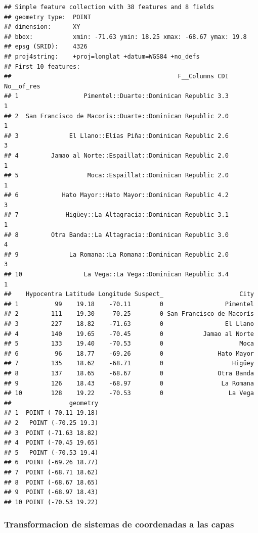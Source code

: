 \documentclass[11pt,]{article}
\begin{document}
\begin{verbatim}
## Simple feature collection with 38 features and 8 fields
## geometry type:  POINT
## dimension:      XY
## bbox:           xmin: -71.63 ymin: 18.25 xmax: -68.67 ymax: 19.8
## epsg (SRID):    4326
## proj4string:    +proj=longlat +datum=WGS84 +no_defs
## First 10 features:
##                                              F__Columns CDI No__of_res
## 1                  Pimentel::Duarte::Dominican Republic 3.3          1
## 2  San Francisco de Macorís::Duarte::Dominican Republic 2.0          1
## 3              El Llano::Elías Piña::Dominican Republic 2.6          3
## 4         Jamao al Norte::Espaillat::Dominican Republic 2.0          1
## 5                   Moca::Espaillat::Dominican Republic 2.0          1
## 6            Hato Mayor::Hato Mayor::Dominican Republic 4.2          3
## 7             Higüey::La Altagracia::Dominican Republic 3.1          1
## 8         Otra Banda::La Altagracia::Dominican Republic 3.0          4
## 9              La Romana::La Romana::Dominican Republic 2.0          3
## 10                 La Vega::La Vega::Dominican Republic 3.4          1
##    Hypocentra Latitude Longitude Suspect_                     City
## 1          99    19.18    -70.11        0                 Pimentel
## 2         111    19.30    -70.25        0 San Francisco de Macorís
## 3         227    18.82    -71.63        0                 El Llano
## 4         140    19.65    -70.45        0           Jamao al Norte
## 5         133    19.40    -70.53        0                     Moca
## 6          96    18.77    -69.26        0               Hato Mayor
## 7         135    18.62    -68.71        0                   Higüey
## 8         137    18.65    -68.67        0               Otra Banda
## 9         126    18.43    -68.97        0                La Romana
## 10        128    19.22    -70.53        0                  La Vega
##                geometry
## 1  POINT (-70.11 19.18)
## 2   POINT (-70.25 19.3)
## 3  POINT (-71.63 18.82)
## 4  POINT (-70.45 19.65)
## 5   POINT (-70.53 19.4)
## 6  POINT (-69.26 18.77)
## 7  POINT (-68.71 18.62)
## 8  POINT (-68.67 18.65)
## 9  POINT (-68.97 18.43)
## 10 POINT (-70.53 19.22)
\end{verbatim}

\subsubsection{Transformacion de sistemas de coordenadas a las
capas}\label{transformacion-de-sistemas-de-coordenadas-a-las-capas}
\end{document}
